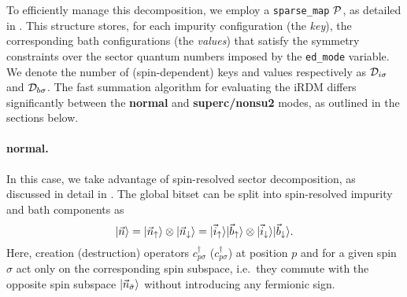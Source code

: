 \documentclass[edipack_sp.tex]{subfiles}
\begin{document}
To efficiently manage this decomposition, we employ a 
{\tt sparse\_map} ${\cal P}$, as detailed in . 
This structure stores, for each impurity configuration 
(the \emph{key}), the 
corresponding bath configurations 
(the \emph{values}) that 
satisfy the symmetry constraints over the sector quantum numbers
imposed by the {\tt ed\_mode} variable.
We denote the number of (spin-dependent) keys and values respectively
as ${\cal D}_{i\sigma}$ and ${\cal D}_{b\sigma}$.
The fast summation algorithm for evaluating the iRDM differs 
significantly between the {\bf normal} and {\bf superc/nonsu2} modes, 
as outlined in the sections below.


\paragraph{{\bf normal}.}
In this case, we take advantage of spin-resolved sector decomposition, 
as discussed in detail in 
. 
The global bitset can be split into spin-resolved 
impurity and bath components as
\begin{equation}
|\vec{n}\rangle =
|\vec{n}_\uparrow\rangle\otimes |\vec{n}_\downarrow\rangle =
|\vec{i}_\uparrow\rangle|\vec{b}_\uparrow\rangle\otimes |\vec{i}_\downarrow\rangle|\vec{b}_\downarrow\rangle.
\label{eq:decomposition_for_rdm_normal}
\end{equation}
Here, creation (destruction) operators  $c^\dagger_{p\sigma}$
($c^\dagger_{p\sigma}$) at position $p$ and for a given spin $\sigma$
act only on the corresponding 
spin subspace, i.e.~they commute with the opposite spin 
subspace $|\vec{n}_{\bar{\sigma}}\rangle$ without introducing any 
fermionic sign.
\end{document}
